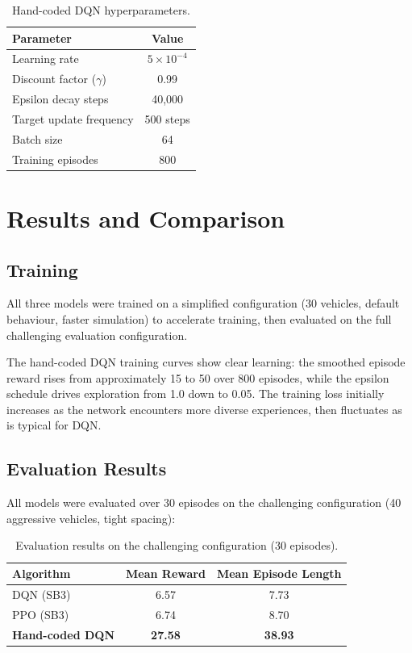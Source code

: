 \documentclass[11pt,a4paper]{article}
\begin{document}
\begin{table}[H]
\centering
\begin{tabular}{lc}
\toprule
\textbf{Parameter} & \textbf{Value} \\
\midrule
Learning rate & $5 \times 10^{-4}$ \\
Discount factor ($\gamma$) & 0.99 \\
Epsilon decay steps & 40,000 \\
Target update frequency & 500 steps \\
Batch size & 64 \\
Training episodes & 800 \\
\bottomrule
\end{tabular}
\caption{Hand-coded DQN hyperparameters.}
\end{table}

\section{Results and Comparison}

\subsection{Training}

All three models were trained on a simplified configuration (30 vehicles, default behaviour, faster simulation) to accelerate training, then evaluated on the full challenging evaluation configuration.

The hand-coded DQN training curves show clear learning: the smoothed episode reward rises from approximately 15 to 50 over 800 episodes, while the epsilon schedule drives exploration from 1.0 down to 0.05. The training loss initially increases as the network encounters more diverse experiences, then fluctuates as is typical for DQN.

\subsection{Evaluation Results}

All models were evaluated over 30 episodes on the challenging configuration (40 aggressive vehicles, tight spacing):

\begin{table}[H]
\centering
\begin{tabular}{lcc}
\toprule
\textbf{Algorithm} & \textbf{Mean Reward} & \textbf{Mean Episode Length} \\
\midrule
DQN (SB3) & 6.57 & 7.73 \\
PPO (SB3) & 6.74 & 8.70 \\
\textbf{Hand-coded DQN} & \textbf{27.58} & \textbf{38.93} \\
\bottomrule
\end{tabular}
\caption{Evaluation results on the challenging configuration (30 episodes).}
\end{table}
\end{document}
